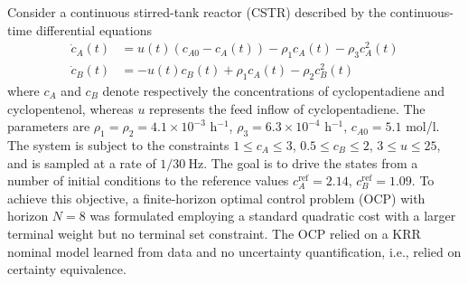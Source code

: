 Consider a continuous stirred-tank reactor (CSTR) described by the continuous-time differential equations \begin{subequations}
	\begin{align}
		\dot{c}_A(t) &= u(t)(c_{A0}-c_A(t)) - \rho_1 c_A(t) - \rho_3 c_A^2(t)  \\ 
		\dot{c}_B(t) &= -u(t)c_B(t) + \rho_1 c_A(t) - \rho_2 c_B^2(t)
	\end{align}
\end{subequations}
where $c_A$ and $c_B$ denote respectively the concentrations of cyclopentadiene and cyclopentenol, whereas $u$ represents the feed inflow of cyclopentadiene. The parameters are $\rho_1 = \rho_2 = 4.1 \times 10^{-3}$ h$^{-1}$, $\rho_3 = 6.3 \times 10^{-4}$ h$^{-1}$, $c_{A0} = 5.1$ mol/l. The system is subject to the constraints $1 \leq c_A \leq 3$, $0.5 \leq c_B \leq 2$, $3 \leq u \leq 25$, and is sampled at a rate of $1/30~$Hz. The goal is to drive the states from a number of initial conditions to the reference values $c_A^{\text{ref}} = 2.14$, $c_B^{\text{ref}} = 1.09$. To achieve this objective, a finite-horizon optimal control problem (OCP) with horizon $N=8$ was formulated employing a standard quadratic cost with a larger terminal weight but no terminal set constraint. The OCP relied on a KRR nominal model learned from data and no uncertainty quantification, i.e., relied on certainty equivalence.

